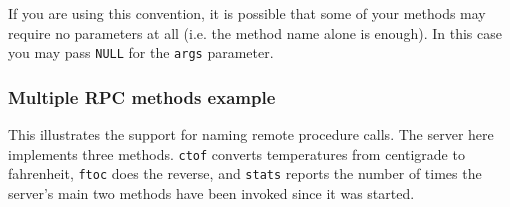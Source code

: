 \documentclass[12pt,a4paper,twoside]{article}
\renewcommand{\_}{\texttt{\symbol{95}}}
\begin{document}
If you are using this convention, it is possible that some of your
methods may require no parameters at all (i.e. the method name alone is
enough). In this case you may pass \texttt{NULL} for the \texttt{args}
parameter.

\subsubsection*{Multiple RPC methods example}

This illustrates the support for naming remote procedure calls. The
server here implements three methods. \texttt{ctof} converts
temperatures from centigrade to fahrenheit, \texttt{ftoc} does the
reverse, and \texttt{stats} reports the number of times the server's
main two methods have been invoked since it was started.
\end{document}
